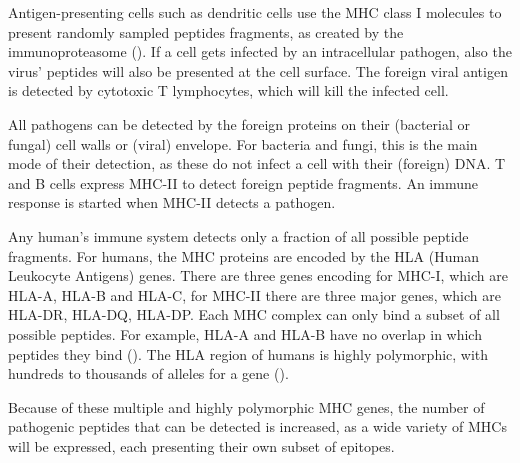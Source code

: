 Antigen-presenting cells such as dendritic cells
use the MHC class I molecules to 
present randomly sampled peptides fragments,
as created by the immunoproteasome (\cite{chapiro2006destructive}).
If a cell gets infected by an intracellular pathogen, also the virus' peptides
will also be presented at the cell surface. The foreign viral antigen is detected 
by cytotoxic T lymphocytes, which will kill the infected cell.


All pathogens can be detected by the foreign proteins on 
their (bacterial or fungal) cell walls or (viral) envelope.
For bacteria and fungi, this is the main mode of their detection,
as these do not infect a cell with their (foreign) DNA.
T and B cells express MHC-II to detect foreign peptide fragments.
An immune response is started when MHC-II detects a pathogen.


Any human's immune system detects only a fraction of all possible
peptide fragments.
For humans, the MHC proteins are encoded by the
HLA (Human Leukocyte Antigens) genes.
There are three genes encoding for MHC-I, which are HLA-A, HLA-B and HLA-C,
for MHC-II there are three major genes, which are HLA-DR, HLA-DQ, HLA-DP.
Each MHC complex can only bind a subset of all possible peptides.
For example, HLA-A and HLA-B have no overlap in which
peptides they bind (\cite{lund2004definition}).
The HLA region of humans is highly polymorphic, with hundreds
to thousands of alleles for a gene (\cite{marsh2010nomenclature}).


Because of these multiple and highly polymorphic MHC genes,
the number of pathogenic peptides that can be detected is increased,
as a wide variety of MHCs will be expressed,
each presenting their own subset of epitopes.


